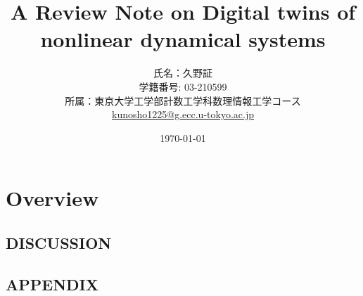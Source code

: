 \documentclass{ltjsarticle} %
\title{A Review Note on Digital twins of nonlinear dynamical systems}
\author{氏名：久野証\\学籍番号: 03-210599\\所属：東京大学工学部計数工学科数理情報工学コース\\\href{mailto:kunosho1225@g.ecc.u-tokyo.ac.jp}{kunosho1225@g.ecc.u-tokyo.ac.jp}
}
\date{\today}
\begin{document}
    \maketitle

    \tableofcontents

    \clearpage

    \section{Overview}
        
        
        
        \subsection{DISCUSSION}
        \subsection{APPENDIX}
\end{document}
